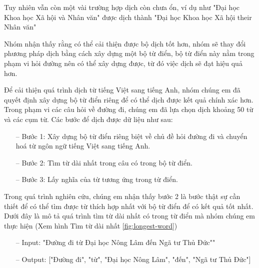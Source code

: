 Tuy nhiên vẫn còn một vài trường hợp dịch còn chưa ổn, ví dụ như "Đại học Khoa học Xã hội và Nhân văn" được dịch thành "Đại học Khoa học Xã hội their Nhân văn"


Nhóm nhận thấy rằng có thể cải thiện được bộ dịch tốt hơn, nhóm sẽ thay đổi phương pháp dịch bằng cách xây dựng một bộ từ điển, bộ từ điển này nằm trong phạm vi hỏi đường nên có thể xây dựng được, từ đó việc dịch sẽ đạt hiệu quả hơn.


Để cải thiện quá trình dịch từ tiếng Việt sang tiếng Anh, nhóm chúng em đã quyết định xây dựng bộ từ điển riêng để có thể dịch được kết quả chính xác hơn.
Trong phạm vi các câu hỏi về đường đi, chúng em đã lựa chọn dịch khoảng 50 từ và các cụm từ. Các bước để dịch được dữ liệu như sau:
\begin{itemize}
    \item[--] Bước 1: Xây dựng bộ từ điển riêng biệt về chủ đề hỏi đường đi và chuyển hoá từ ngôn ngữ tiếng Việt sang tiếng Anh.
    \item[--] Bước 2: Tìm từ dài nhất trong câu có trong bộ từ điển.
    \item[--] Bước 3: Lấy nghĩa của từ tương ứng trong từ điển.
\end{itemize}
Trong quá trình nghiên cứu, chúng em nhận thấy bước 2 là bước thật sự cần thiết để có thể tìm được từ thích hợp nhất với bộ từ điển để có kết quả tốt nhất. Dưới đây là mô tả quá trình tìm từ dài nhất có trong từ điển mà nhóm chúng em thực hiện (Xem hình Tìm từ dài nhất \ref{fig:longest-word})
\begin{itemize}
    \item[--] Input: "Đường đi từ Đại học Nông Lâm đến Ngã tư Thủ Đức""
    \item[--] Output: ["Đường đi", "từ", "Đại học Nông Lâm", "đến", "Ngã tư Thủ Đức"]
\end{itemize}
